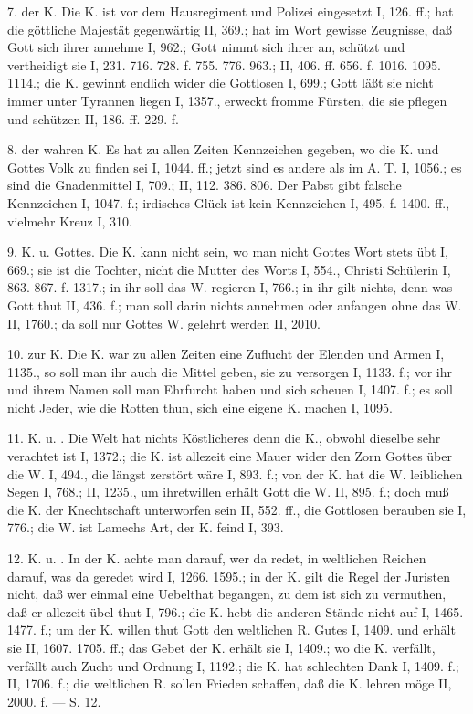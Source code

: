 7.  der K. Die K. ist vor dem Hausregiment und Polizei eingesetzt I, 126. ff.; hat die göttliche Majestät gegenwärtig II, 369.; hat im Wort gewisse Zeugnisse, daß Gott sich ihrer annehme I, 962.; Gott nimmt sich ihrer an, schützt und vertheidigt sie I, 231. 716. 728. f. 755. 776. 963.; II, 406. ff. 656. f. 1016. 1095. 1114.; die K. gewinnt endlich wider die Gottlosen I, 699.; Gott läßt sie nicht immer unter Tyrannen liegen I, 1357., erweckt fromme Fürsten, die sie pflegen und schützen II, 186. ff. 229. f.

8.  der wahren K. Es hat zu allen Zeiten Kennzeichen gegeben, wo die K. und Gottes Volk zu finden sei I, 1044. ff.; jetzt sind es andere als im A. T. I, 1056.; es sind die Gnadenmittel I, 709.; II, 112. 386. 806. Der Pabst gibt falsche Kennzeichen I, 1047. f.; irdisches Glück ist kein Kennzeichen I, 495. f. 1400. ff., vielmehr Kreuz I, 310.

9. K. u.  Gottes. Die K. kann nicht sein, wo man nicht Gottes Wort stets übt I, 669.; sie ist die Tochter, nicht die Mutter des Worts I, 554., Christi Schülerin I, 863. 867. f. 1317.; in ihr soll das W. regieren I, 766.; in ihr gilt nichts, denn was Gott thut II, 436. f.; man soll darin nichts annehmen oder anfangen ohne das W. II, 1760.; da soll nur Gottes W. gelehrt werden II, 2010.

10.  zur K. Die K. war zu allen Zeiten eine Zuflucht der Elenden und Armen I, 1135., so soll man ihr auch die Mittel geben, sie zu versorgen I, 1133. f.; vor ihr und ihrem Namen soll man Ehrfurcht haben und sich scheuen I, 1407. f.; es soll nicht Jeder, wie die Rotten thun, sich eine eigene K. machen I, 1095.

11. K. u. . Die Welt hat nichts Köstlicheres denn die K., obwohl dieselbe sehr verachtet ist I, 1372.; die K. ist allezeit eine Mauer wider den Zorn Gottes über die W. I, 494., die längst zerstört wäre I, 893. f.; von der K. hat die W. leiblichen Segen I, 768.; II, 1235., um ihretwillen erhält Gott die W. II, 895. f.; doch muß die K. der Knechtschaft unterworfen sein II, 552. ff., die Gottlosen berauben sie I, 776.; die W. ist Lamechs Art, der K. feind I, 393.

12. K. u. . In der K. achte man darauf, wer da redet, in weltlichen Reichen darauf, was da geredet wird I, 1266. 1595.; in der K. gilt die Regel der Juristen nicht, daß wer einmal eine Uebelthat begangen, zu dem ist sich zu vermuthen, daß er allezeit übel thut I, 796.; die K. hebt die anderen Stände nicht auf I, 1465. 1477. f.; um der K. willen thut Gott den weltlichen R. Gutes I, 1409. und erhält sie II, 1607. 1705. ff.; das Gebet der K. erhält sie I, 1409.; wo die K. verfällt, verfällt auch Zucht und Ordnung I, 1192.; die K. hat schlechten Dank I, 1409. f.; II, 1706. f.; die weltlichen R. sollen Frieden schaffen, daß die K. lehren möge II, 2000. f. — S.  12.

